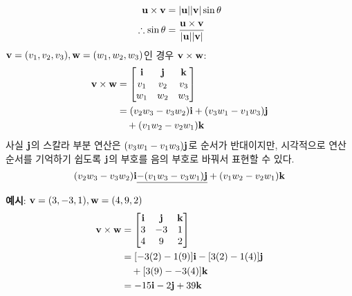 $$
\begin{aligned}
  \bold{u} \times \bold{v} &= |\bold{u}| |\bold{v}| \sin{\theta} \\
  \therefore \sin{\theta} &= {\bold{u} \times \bold{v} \over |\bold{u}| |\bold{v}|}
\end{aligned}
$$
$\bold{v} = (v_1, v_2, v_3), \bold{w} = (w_1, w_2, w_3)$인 경우 $\bold{v} \times \bold{w}$:
$$
\begin{aligned}
  \bold{v} \times \bold{w} &=
  \begin{bmatrix}
    \bold{i} & \bold{j} & \bold{k} \\
    v_1 & v_2 & v_3 \\
    w_1 & w_2 & w_3
  \end{bmatrix} \\
  &= (v_2 w_3 - v_3 w_2)\bold{i} + (v_3 w_1 - v_1 w_3)\bold{j} \\
  &\quad + (v_1 w_2 - v_2 w_1)\bold{k}
\end{aligned}
$$
사실 $\bold{j}$의 스칼라 부분 연산은 $(v_3 w_1 - v_1 w_3)\bold{j}$로 순서가 반대이지만, 시각적으로 연산 순서를 기억하기 쉽도록 $\bold{j}$의 부호를 음의 부호로 바꿔서 표현할 수 있다.
$$
(v_2 w_3 - v_3 w_2)\bold{i} \underline{- (v_1 w_3 - v_3 w_1)\bold{j}} + (v_1 w_2 - v_2 w_1)\bold{k}
$$

\begin{framed}
  \noindent \textbf{예시}: $\bold{v} = (3, -3, 1), \bold{w} = (4, 9, 2)$
  $$
  \begin{aligned}
    \bold{v} \times \bold{w} &=
    \begin{bmatrix}
      \bold{i} & \bold{j} & \bold{k} \\
      3 & -3 & 1 \\
      4 & 9 & 2
    \end{bmatrix} \\
    &= [-3(2) - 1(9)]\bold{i} - [3(2) - 1(4)]\bold{j} \\
    &\quad + [3(9) - -3(4)]\bold{k} \\
    &= -15\bold{i} - 2\bold{j} + 39\bold{k}
  \end{aligned}
  $$
\end{framed}

